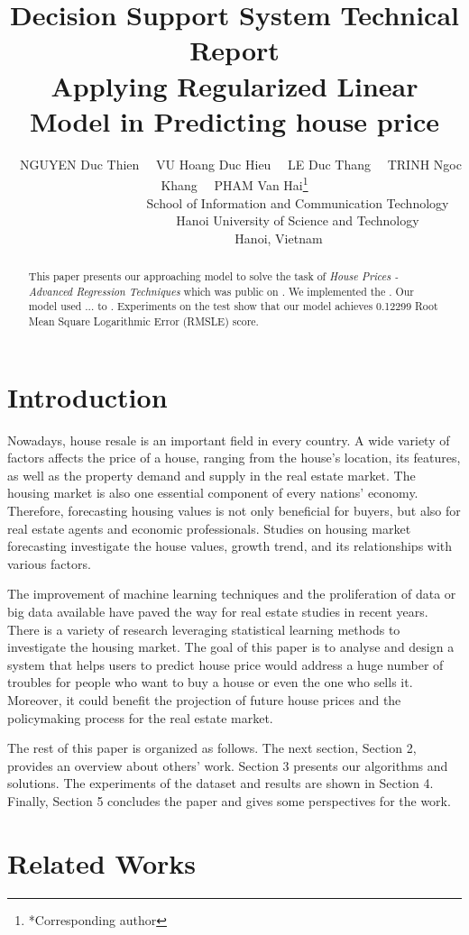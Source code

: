 \documentclass[11pt,a4paper]{article}
\title{Decision Support System Technical Report \\ 
Applying Regularized Linear Model in Predicting house price 
}
\author{~~NGUYEN Duc Thien ~~VU Hoang Duc Hieu ~~LE Duc Thang ~~TRINH Ngoc Khang ~~PHAM Van Hai\thanks{*Corresponding author} \\
  ~~~~~~~~~~~~~~~~~~~~School of Information and Communication Technology \\
  ~~~~~~~~~~~~~~~~~~~~Hanoi University of Science and Technology \\
  ~~~~~~~~~~~~~~Hanoi, Vietnam \\
}
\date{}
\begin{document}
\maketitle

\begin{abstract}

This paper presents our approaching model to solve the task of \emph{House Prices - Advanced Regression Techniques} which was public on \cite{kaggle}. We implemented the . Our model used ... to . Experiments on the test show that our model achieves 0.12299 Root Mean Square Logarithmic Error (RMSLE) score. 

\end{abstract}

\section{Introduction}

Nowadays, house resale is an important field in every country. A wide variety of factors affects the price of a house, ranging from the house’s location, its features, as well as the property demand and supply in the real estate market. The housing market is also one essential component of every nations’ economy. Therefore, forecasting housing values is not only beneficial for buyers, but also for real estate agents and economic professionals. Studies on housing market forecasting investigate the house values, growth trend, and its relationships with various factors. 

The improvement of machine learning techniques and the proliferation of data or big data available have paved the way for real estate studies in recent years. There is a variety of research leveraging statistical learning methods to investigate the housing market. The goal of this paper is to  analyse and design a system that helps users to predict house price would address a huge number of troubles for people who want to buy a house or even the one who sells it. Moreover, it could benefit the projection of future house prices and the policymaking process for the real estate market.

The rest of this paper is organized as follows. The next section, Section 2, provides an overview about others' work. Section 3 presents our algorithms and solutions. The experiments of the dataset and results are shown in Section 4. Finally, Section 5 concludes the paper and gives some perspectives for the work.

\section{Related Works}
\end{document}

